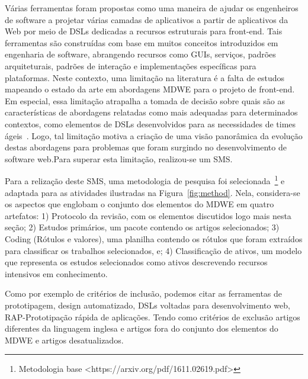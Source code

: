 Várias ferramentas foram propostas como uma maneira de ajudar os engenheiros de software a projetar várias camadas de aplicativos a partir de aplicativos da Web por meio de DSLs dedicadas a recursos estruturais para front-end. Tais ferramentas são construídas com base em muitos conceitos introduzidos em engenharia de software, abrangendo recursos como GUIs, serviços, padrões arquiteturais, padrões de interação e implementações específicas para plataformas. Neste contexto, uma limitação na literatura é a falta de estudos mapeando o estado da arte em abordagens MDWE para o projeto de front-end. Em especial, essa limitação atrapalha a tomada de decisão sobre quais são as características de abordagens relatadas como mais adequadas para determinados contextos, como elementos de DSLs desenvolvidos para as necessidades de times ágeis~\cite{Rivero2014}. Logo, tal limitação motiva a criação de uma visão panorâmica da evolução destas abordagens para problemas que foram surgindo no desenvolvimento de software web.Para superar esta limitação, realizou-se um SMS. 

Para a relização deste SMS, uma metodologia de pesquisa foi selecionada~\footnote{Metodologia base <https://arxiv.org/pdf/1611.02619.pdf>} e adaptada para as atividades ilustradas na Figura~\ref{fig:method}. Nela, considera-se os aspectos que englobam o conjunto dos elementos do MDWE em quatro artefatos: 1) Protocolo da revisão, com os elementos discutidos logo mais nesta seção; 2) Estudos primários, um pacote contendo os artigos selecionados; 3) Coding (Rótulos e valores), uma planilha contendo os rótulos que foram extraídos para classificar os trabalhos selecionados, e; 4) Classificação de ativos, um modelo que representa os estudos selecionados como ativos descrevendo recursos intensivos em conhecimento. %











Como por exemplo de critérios de inclusão, podemos citar as ferramentas de prototipagem, design automatizado, DSLs voltadas para desenvolvimento web, RAP-Prototipação rápida de aplicações. Tendo como critérios de exclusão artigos diferentes da linguagem inglesa e artigos fora do conjunto dos elementos do MDWE e artigos desatualizados.

